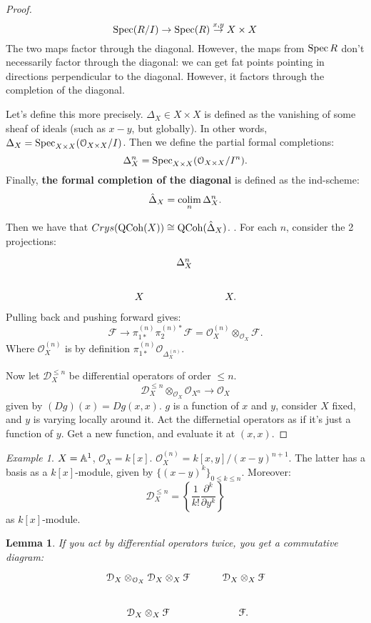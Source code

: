 \documentclass[10pt,a4paper,reqno,oneside]{book} %
\theoremstyle{plain}
\newtheorem{lem}[thm]{Lemma}
\theoremstyle{definition}
\theoremstyle{remark}
\newtheorem{eg}[thm]{Example}
\numberwithin{equation}{section}
\begin{document}
\begin{proof}
\[	\operatorname{Spec} (R/I) \to \operatorname{Spec}(R) \overset{x,y}{\to} X \times X	\]
The two maps factor through the diagonal. However, the maps from $\operatorname{Spec} R$ don't necessarily factor through the diagonal:
we can get fat points pointing in directions perpendicular to the diagonal. However, it factors through the completion of
the diagonal.

Let's define this more precisely. $\Delta_X \in X \times X$ is defined as the vanishing of some sheaf of ideals (such
as $x-y$, but globally). In other words, $\Delta_X = \operatorname{Spec}_{X\times X}(\mathcal{O}_{X\times X}/I)$. Then we define
the partial formal completions:
\[	\Delta^n_X = \operatorname{Spec}_{X\times X} (\mathcal{O}_{X\times X}/I^n) .	\]
Finally, \textbf{the formal completion of the diagonal} is defined as the ind-scheme:
\[	\hat \Delta_X = \operatorname*{colim}_n \Delta^n_X.	\]

Then we have that $Crys(\mathrm{QCoh}(X)) \cong \mathrm{QCoh}(\hat \Delta_X)$. . For each $n$, consider the 2 projections:
\[
\begin{tikzcd}
\; & \Delta^n_X & \\
X & & X.
\end{tikzcd}
\]
Pulling back and pushing forward gives:
\[	\mathcal{F} \to \pi^{(n)}_{1*} \pi_2^{(n)*} \mathcal{F} = \mathcal{O}_X^{(n)} \otimes_{\mathcal{O}_X} \mathcal{F}.	\]
Where $\mathcal{O}_X^{(n)}$ is by definition $\pi_{1*}^{(n)}\mathcal{O}_{\Delta^{(n)}_X}$.

Now let $\mathcal{D}_X^{\leq n}$ be differential operators of order $\leq n$.
\[	\mathcal{D}_X^{\leq n} \otimes_{\mathcal{O}_X} \mathcal{O}_{X^n} \to \mathcal{O}_X	\]
given by $(Dg)(x) = Dg(x,x)$. $g$ is a function of $x$ and $y$, consider $X$ fixed, and $y$ is varying locally around it.
Act the differnetial operators as if it's just a function of $y$. Get a new function, and evaluate it at $(x,x)$.
\end{proof}

\begin{eg}
$X = \mathbb A^1$, $\mathcal{O}_X = k[x]$. $\mathcal{O}_X^{(n)} = k[x,y]/(x-y)^{n+1}$. The latter has a basis as
a $k[x]$-module, given by $\{(x-y)^k\}_{0\leq k \leq n}$. Moreover:
\[	\mathcal{D}_X^{\leq n} = \left\{ \frac{1}{k!} \frac{\partial^k}{\partial y^k} \right\}	\]
as $k[x]$-module.
\end{eg}

\begin{lem}
If you act by differential operators twice, you get a commutative diagram:
\[
\begin{tikzcd}
\mathcal{D}_X \otimes_{\mathcal{O}_X} \mathcal{D}_X \otimes_X \mathcal{F} & \mathcal{D}_X \otimes_X \mathcal{F} \\
\mathcal{D}_X \otimes_X \mathcal{F} & \mathcal{F}.
\end{tikzcd}
\]
\end{lem}
\end{document}
